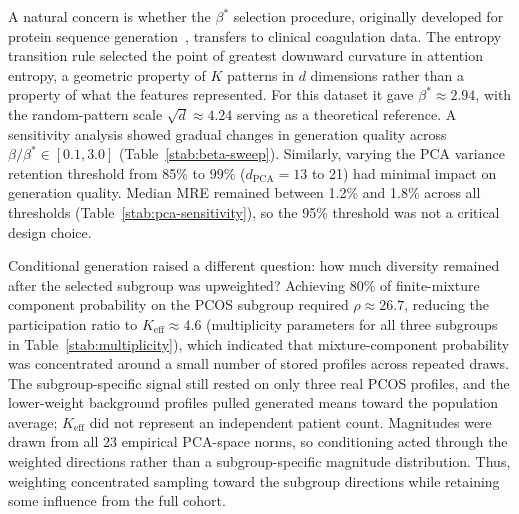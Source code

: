  A natural concern is whether the $\beta^*$
selection procedure, originally developed for protein sequence
generation~\citep{Varner2026SAProtein}, transfers to clinical coagulation data. The entropy
transition rule selected the point of greatest downward curvature in attention entropy, a
geometric property of $K$ patterns in $d$ dimensions rather than a property of what the
features represented. For this dataset it gave $\beta^* \approx 2.94$, with the random-pattern
scale $\sqrt{d} \approx 4.24$ serving as a theoretical reference. A sensitivity analysis
showed gradual changes in generation quality across $\beta/\beta^* \in [0.1, 3.0]$
(Table~\ref{stab:beta-sweep}).
Similarly, varying the PCA variance retention threshold from 85\% to 99\%
($d_{\text{PCA}} = 13$ to 21) had minimal impact on generation quality. Median MRE
remained between 1.2\% and 1.8\% across all thresholds (Table~\ref{stab:pca-sensitivity}),
so the 95\% threshold was not a critical design choice. 

Conditional generation raised a different question: how much diversity remained after the
selected subgroup was upweighted? Achieving
80\% of finite-mixture component probability on the PCOS subgroup required
$\rho \approx 26.7$, reducing the participation ratio to
$K_{\text{eff}} \approx 4.6$ (multiplicity parameters
for all three subgroups in Table~\ref{stab:multiplicity}),
which indicated that mixture-component probability was concentrated around a small number
of stored profiles across repeated draws. The subgroup-specific signal still rested on only
three real PCOS profiles, and the lower-weight background profiles pulled generated means
toward the population average; $K_{\text{eff}}$ did not represent an independent patient
count. Magnitudes were drawn from all $23$ empirical PCA-space norms, so conditioning acted
through the weighted directions rather than a subgroup-specific magnitude distribution.
Thus, weighting concentrated sampling toward the subgroup directions while retaining some
influence from the full cohort.

